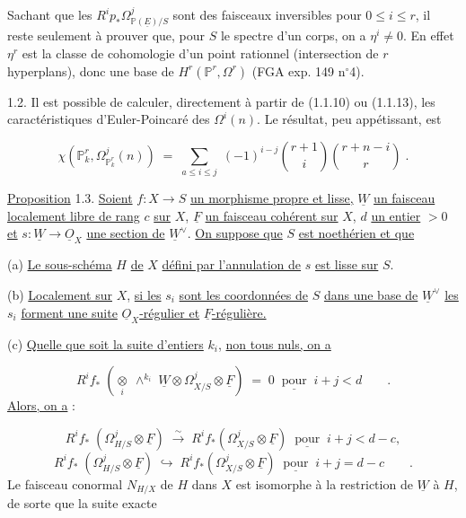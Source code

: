 Sachant que les $R^i p_* \Omega^j_{\mathbb{P}(\underline{E})/S}$ sont des faisceaux inversibles pour $0 \leq i \leq r$, il reste seulement à prouver que, pour $S$ le spectre d'un corps, on a $\eta^i \neq 0$. En effet $\eta^r$ est la classe de cohomologie d'un point rationnel (intersection de $r$ hyperplans), donc une base de $H^r(\mathbb{P}^r,\Omega^r)$ (FGA exp. 149 n$^{\circ}$4).

1.2. Il est possible de calculer, directement à partir de (1.1.10) ou (1.1.13), les caractéristiques d'Euler-Poincaré des $\Omega^i(n)$. Le résultat, peu appétissant, est

\begin{equation*}
\chi(\mathbb{P}^r_k,\Omega^j_{\mathbb{P}^r_k}(n)) \;=\; \sum_{a \leq i \leq j} \; (-1)^{i-j} \binom{r+1}{i}\binom{r+n-i}{r} \; .
\end{equation*}


\underline{Proposition} 1.3. \underline{Soient} $f : X \longrightarrow S$ \underline{un morphisme propre et lisse,} $\underline{W}$ \underline{un faisceau localement libre de rang} $c$ \underline{sur} $X$, $\underline{F}$ \underline{un faisceau cohérent sur} $X$, $d$ \underline{un entier} $> 0$ \underline{et} $s : \underline{W} \longrightarrow \underline{O}_X$ \underline{une section de} $\underline{W}^{\vee}$. \underline{On suppose que} $S$ \underline{est noethérien et que}

(a) \underline{Le sous-schéma} $H$ \underline{de} $X$ \underline{défini par l'annulation de} $s$ \underline{est lisse sur} $S$.

(b) \underline{Localement sur} $X$, \underline{si les} $s_i$ \underline{sont les coordonnées de} $S$ \underline{dans une base de} $\underline{W}^{\vee}$ \underline{les} $s_i$ \underline{forment une suite} $\underline{O}_X$\underline{-régulier et} $\underline{F}$\underline{-régulière.}

(c) \underline{Quelle que soit la suite d'entiers} $k_i$, \underline{non tous nuls, on a}

\begin{equation*}
R^i f_* \; (\underset{i}{\otimes} \; \wedge^{k_i} \; \underline{W} \otimes \Omega^j_{X/S} \otimes \underline{F}) \;=\; 0 \;\; \underline{\text{pour}} \;\; i+j < d \qquad .
\end{equation*}
\underline{Alors, on a} :

\begin{equation*}
R^i f_* \; (\Omega^j_{H/S} \otimes \underline{F}) \; \overset{\sim}{\longrightarrow} \; R^i f_*(\Omega^j_{X/S} \otimes \underline{F}) \;\; \underline{\text{pour}} \;\; i+j < d-c,
\end{equation*}
\begin{equation}\tag{ii}
R^i f_* \; (\Omega^j_{H/S} \otimes \underline{F}) \; \hookrightarrow \; R^i f_*(\Omega^j_{X/S} \otimes \underline{F}) \;\; \underline{\text{pour}} \;\; i+j = d-c \qquad .
\end{equation}
Le faisceau conormal $N_{H/X}$ de $H$ dans $X$ est isomorphe à la restriction de $\underline{W}$ à $H$, de sorte que la suite exacte

